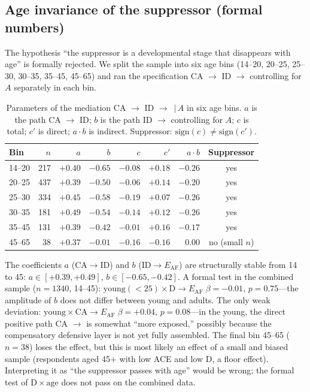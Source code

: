 \subsection{Age invariance of the suppressor (formal numbers)}
\label{subsec:age_invariance_numbers}

The hypothesis ``the suppressor is a developmental stage that disappears with age'' is formally rejected. We split the sample into six age bins (14--20, 20--25, 25--30, 30--35, 35--45, 45--65) and ran the specification CA $\to$ ID $\to$ \EAF{} controlling for $A$ separately in each bin.

\begin{table}[htbp]
\centering
\small
\caption[Suppressor parameters by age bin]{Parameters of the mediation CA $\to$ ID $\to$ \EAF{}\,$|$\,$A$ in six age bins. $a$ is the path CA $\to$ ID; $b$ is the path ID $\to$ \EAF{} controlling for $A$; $c$ is total; $c'$ is direct; $a \cdot b$ is indirect. Suppressor: $\mathrm{sign}(c) \neq \mathrm{sign}(c')$.}
\label{tab:age_bins_suppressor}
\begin{tabular}{lrrrrrrc}
\hline
Bin & $n$ & $a$ & $b$ & $c$ & $c'$ & $a\cdot b$ & Suppressor \\
\hline
14--20 & 217 & $+0.40$ & $-0.65$ & $-0.08$ & $+0.18$ & $-0.26$ & yes \\
20--25 & 437 & $+0.39$ & $-0.50$ & $-0.06$ & $+0.14$ & $-0.20$ & yes \\
25--30 & 334 & $+0.45$ & $-0.58$ & $-0.19$ & $+0.07$ & $-0.26$ & yes \\
30--35 & 181 & $+0.49$ & $-0.54$ & $-0.14$ & $+0.12$ & $-0.26$ & yes \\
35--45 & 131 & $+0.39$ & $-0.42$ & $-0.01$ & $+0.16$ & $-0.17$ & yes \\
45--65 & 38 & $+0.37$ & $-0.01$ & $-0.16$ & $-0.16$ & $0.00$ & no (small $n$) \\
\hline
\end{tabular}
\end{table}

The coefficients $a$ ($\mathrm{CA}\to\mathrm{ID}$) and $b$ ($\mathrm{ID}\to E_{\mathrm{AF}}$) are structurally stable from 14 to 45: $a \in [+0.39, +0.49]$, $b \in [-0.65, -0.42]$. A formal test in the combined sample ($n = 1340$, 14--45): $\mathrm{young}(<25) \times \mathrm{D} \to E_{\mathrm{AF}} \; \beta = -0.01$, $p = 0.75$---the amplitude of $b$ does not differ between young and adults. The only weak deviation: $\mathrm{young} \times \mathrm{CA} \to E_{\mathrm{AF}} \; \beta = +0.04$, $p = 0.08$---in the young, the direct positive path CA $\to$ \EAF{} is somewhat ``more exposed,'' possibly because the compensatory defensive layer is not yet fully assembled. The final bin 45--65 ($n = 38$) loses the effect, but this is most likely an effect of a small and biased sample (respondents aged 45$+$ with low ACE and low D, a floor effect). Interpreting it as ``the suppressor passes with age'' would be wrong; the formal test of $\mathrm{D}\times\mathrm{age}$ does not pass on the combined data.

